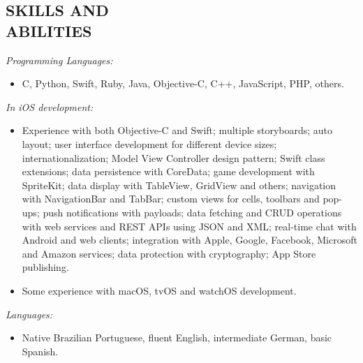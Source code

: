 \documentclass[margin]{res}
\begin{document}
\begin{resume}
		\section{SKILLS AND \\ABILITIES}
			{\sl Programming Languages:}
			\begin{itemize}
	 			\item[] C, Python, Swift, Ruby, Java, Objective-C, C++, JavaScript, PHP, others.
	  		\end{itemize}
			{\sl In iOS development:}
			\begin{itemize}
				\item [] Experience with both Objective-C and Swift; multiple storyboards; auto layout; user interface development for different device sizes; internationalization; Model View Controller design pattern; Swift class extensions; data persistence with CoreData; game development with SpriteKit; data display with TableView, GridView and others; navigation with NavigationBar and TabBar; custom views for cells, toolbars and pop-ups; push notifications with payloads; data fetching and CRUD operations with web services and REST APIs using JSON and XML; real-time chat with Android and web clients; integration with Apple, Google, Facebook, Microsoft and Amazon services; data protection with cryptography; App Store publishing.
				\item [] Some experience with macOS, tvOS and watchOS development.
			\end{itemize}
			{\sl Languages:}
			\begin{itemize}
				\item[] Native Brazilian Portuguese, fluent English, intermediate German, basic Spanish.
			\end{itemize}


\end{resume}
\end{document}

